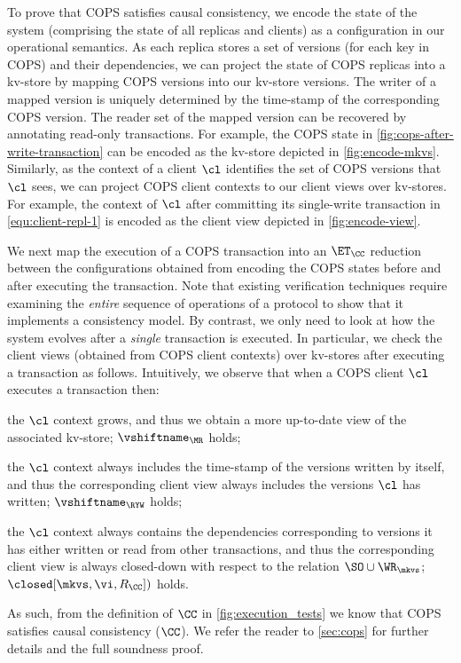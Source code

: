 

To prove that COPS satisfies causal consistency,
we encode the state of the system 
(comprising the state of all replicas and clients) as a
configuration in  our operational semantics. 
As each replica stores a set of versions (for each key in COPS) and their dependencies, 
we can project the state of  COPS replicas into a kv-store 
by mapping  COPS versions into our kv-store versions.
The writer of a mapped version is uniquely
determined by the time-stamp of the corresponding COPS version.
The reader set of the mapped version 
can be recovered by annotating read-only transactions.
For example, the COPS state in \cref{fig:cops-after-write-transaction} can be encoded as the kv-store depicted in \cref{fig:encode-mkvs}.
Similarly, as the context of a client $\cl$ identifies the set of COPS versions that $\cl$ sees, 
we can project COPS client contexts to our client views over kv-stores. 
For example, the context of \( \cl \) after committing its single-write transaction in \eqref{equ:client-repl-1} is encoded as the client view depicted in \cref{fig:encode-view}.

We next map the execution of a COPS transaction into an $\ET_{\CC}$ reduction between the configurations 
obtained from encoding the COPS states before and after executing the transaction.
Note that existing verification techniques \cite{framework-concur,seebelieve} require examining the \emph{entire} sequence of operations of a protocol to show that it implements a consistency model.
By contrast, we only need to look at how the system evolves after a \emph{single} transaction is executed.
In particular, we check the client views (obtained from COPS client contexts) over kv-stores after executing a transaction as follows.
Intuitively, we observe that when a COPS client $\cl$ executes a transaction then:
\begin{enumerate*} 
\item the $\cl$ context grows, and thus we obtain a more up-to-date view of the associated kv-store; \ie $\vshiftname_{\MR}$ holds;
\item the $\cl$ context always includes the time-stamp of the versions written by itself, and thus the 
corresponding client view always includes the versions $\cl$ has written; \ie $\vshiftname_{\RYW}$ holds; 
\item the $\cl$ context always contains the dependencies corresponding to versions it has 
either written or read from other transactions, and thus the corresponding client view is always closed-down 
with respect to the relation $\SO \cup \WR_{\mkvs}$; \ie $\closed[\mkvs, \vi, R_{\CC}])$ holds.
\end{enumerate*}
As such, from the definition of $\CC$ in \cref{fig:execution_tests} we know that COPS satisfies causal consistency ($\CC$).
We refer the reader to  \cref{sec:cops} for further details and the full soundness proof.

